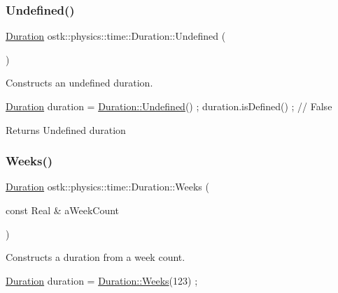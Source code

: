 \subsubsection{\texorpdfstring{Undefined()}{Undefined()}}
{\footnotesize\ttfamily \hyperlink{classostk_1_1physics_1_1time_1_1_duration}{Duration} ostk\+::physics\+::time\+::\+Duration\+::\+Undefined (\begin{DoxyParamCaption}{ }\end{DoxyParamCaption})\hspace{0.3cm}{\ttfamily [static]}}



Constructs an undefined duration. 


\begin{DoxyCode}
\hyperlink{classostk_1_1physics_1_1time_1_1_duration_a6ba3a020742ca6e3bf0b1970dd039c07}{Duration} duration = \hyperlink{classostk_1_1physics_1_1time_1_1_duration_a568046182c0bc460b7e93de8b4084768}{Duration::Undefined}() ;
duration.isDefined() ; \textcolor{comment}{// False}
\end{DoxyCode}


\begin{DoxyReturn}{Returns}
Undefined duration 
\end{DoxyReturn}
\mbox{\label{classostk_1_1physics_1_1time_1_1_duration_a6186e3350364f407e390f520b93dbf83}} 
\subsubsection{\texorpdfstring{Weeks()}{Weeks()}}
{\footnotesize\ttfamily \hyperlink{classostk_1_1physics_1_1time_1_1_duration}{Duration} ostk\+::physics\+::time\+::\+Duration\+::\+Weeks (\begin{DoxyParamCaption}\item[{const Real \&}]{a\+Week\+Count }\end{DoxyParamCaption})\hspace{0.3cm}{\ttfamily [static]}}



Constructs a duration from a week count. 


\begin{DoxyCode}
\hyperlink{classostk_1_1physics_1_1time_1_1_duration_a6ba3a020742ca6e3bf0b1970dd039c07}{Duration} duration = \hyperlink{classostk_1_1physics_1_1time_1_1_duration_a6186e3350364f407e390f520b93dbf83}{Duration::Weeks}(123) ;
\end{DoxyCode}



